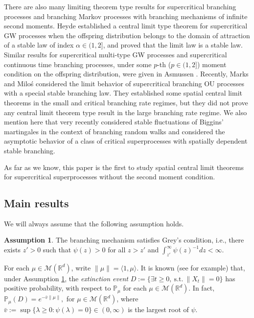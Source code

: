 \documentclass[12pt,a4paper]{amsart}
\theoremstyle{plain}
\theoremstyle{definition}
\newtheorem{asp}{Assumption}
\numberwithin{equation}{section}
\begin{document}
There are also many limiting theorem type results for supercritical branching processes and branching Markov processes with branching mechanisms of infinite second moments.
Heyde \cite{Heyde1971Some} established a central limit type  theorem 
for supercritical GW processes when the offspring distribution
belongs to the domain of attraction of a stable law of index $\alpha\in (1, 2]$, and proved that the limit law is  a stable law. 
Similar results  for supercritical multi-type 
GW processes and supercritical  continuous time branching processes, 
under some $p$-th ($p\in(1,2]$) moment condition on the offspring distribution, were given in Asmussen \cite{Asmussen76Convergence}.
Recently, Marks and Milo\'s \cite{MarksMilos2018CLT}
considered the limit behavior of supercritical branching OU processes
with a special stable branching law.
They established some spatial central limit theorems in the small and critical branching rate regimes, but they did not prove any central limit theorem type result in the large branching rate regime.
We also mention here that very recently \cite{IksanovKoleskoMeiners2018Stable-like} considered stable fluctuations of Biggins' martingales in the context of branching random walks and \cite{RenSongSun2018Limit} considered the asymptotic behavior of a class of critical superprocesses with spatially dependent stable branching.

As far as we know, this paper is the first to study spatial central limit theorems for supercritical superprocesses without the second moment condition.

\subsection{Main results}
\label{sec: main results}{}
We will always assume that the following assumption holds.
\begin{asp}
\label{asp: Greys condition}
The branching mechanism satisfies Grey's condition, i.e., there exists $z' > 0$ such that $\psi(z) > 0$ for all $z>z'$ and  $\int_{z'}^\infty \psi(z)^{-1}dz < \infty$.
\end{asp}
For each $\mu \in \mathcal M(\mathbb R^d)$, write $\|\mu\| = \langle 1, \mu\rangle$.
It is known (see \cite[Theorems 12.5 \& 12.7]{Kyprianou2014Fluctuations} for example) that, under Assumption \ref{asp: Greys condition}, the \emph{extinction event} $D :=\{\exists t\geq 0,~\text{s.t.}~ \|X_t\| =0 \}$ has positive probability, with respect to $\mathbb P_\mu$ for each  $\mu \in \mathcal M(\mathbb R^d)$.
In fact,
$
\mathbb{P}_{\mu} (D)
= e^{-\bar v \|\mu\|},
$ 
for $\mu\in \mathcal M(\mathbb R^d)$,
where
$
\bar v := \sup\{\lambda \geq 0: \psi(\lambda) = 0\} \in (0,\infty)
$
is the largest root of $\psi$.
\end{document}
